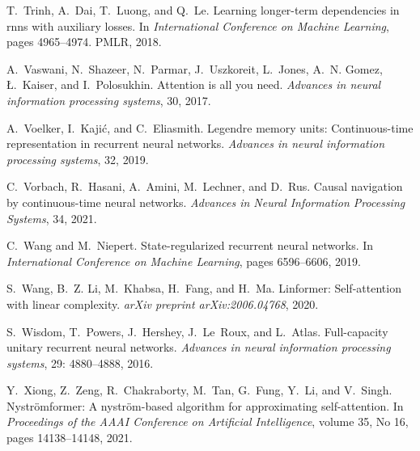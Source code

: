 \documentclass{MITcsail}
\begin{document}
\begin{thebibliography}{96}
T.~Trinh, A.~Dai, T.~Luong, and Q.~Le.
\newblock Learning longer-term dependencies in rnns with auxiliary losses.
\newblock In \emph{International Conference on Machine Learning}, pages
  4965--4974. PMLR, 2018.

A.~Vaswani, N.~Shazeer, N.~Parmar, J.~Uszkoreit, L.~Jones, A.~N. Gomez,
  {\L}.~Kaiser, and I.~Polosukhin.
\newblock Attention is all you need.
\newblock \emph{Advances in neural information processing systems}, 30, 2017.

A.~Voelker, I.~Kaji{\'c}, and C.~Eliasmith.
\newblock Legendre memory units: Continuous-time representation in recurrent
  neural networks.
\newblock \emph{Advances in neural information processing systems}, 32, 2019.

C.~Vorbach, R.~Hasani, A.~Amini, M.~Lechner, and D.~Rus.
\newblock Causal navigation by continuous-time neural networks.
\newblock \emph{Advances in Neural Information Processing Systems}, 34, 2021.

C.~Wang and M.~Niepert.
\newblock State-regularized recurrent neural networks.
\newblock In \emph{International Conference on Machine Learning}, pages
  6596--6606, 2019.

S.~Wang, B.~Z. Li, M.~Khabsa, H.~Fang, and H.~Ma.
\newblock Linformer: Self-attention with linear complexity.
\newblock \emph{arXiv preprint arXiv:2006.04768}, 2020.

S.~Wisdom, T.~Powers, J.~Hershey, J.~Le~Roux, and L.~Atlas.
\newblock Full-capacity unitary recurrent neural networks.
\newblock \emph{Advances in neural information processing systems},
  29: 4880--4888, 2016.

Y.~Xiong, Z.~Zeng, R.~Chakraborty, M.~Tan, G.~Fung, Y.~Li, and V.~Singh.
\newblock Nystr{\"o}mformer: A nystr{\"o}m-based algorithm for approximating
  self-attention.
\newblock In \emph{Proceedings of the AAAI Conference on Artificial
  Intelligence}, volume 35, No 16, pages 14138--14148, 2021.


\end{thebibliography}
\end{document}
